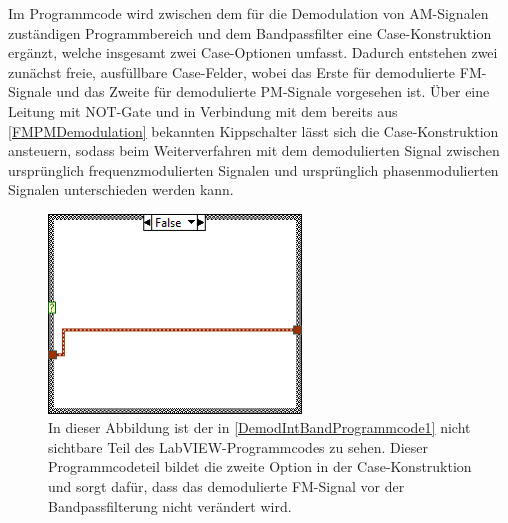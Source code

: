 \documentclass[
a4paper,
12pt,
pagesize,
ngerman
]{scrartcl}
\begin{document}
	
	Im Programmcode wird zwischen dem für die Demodulation von AM-Signalen zuständigen Programmbereich und dem Bandpassfilter eine Case-Konstruktion ergänzt, welche insgesamt zwei Case-Optionen umfasst.
	Dadurch entstehen zwei zunächst freie, ausfüllbare Case-Felder, wobei das Erste für demodulierte FM-Signale und das Zweite für demodulierte PM-Signale vorgesehen ist.
	Über eine Leitung mit NOT-Gate und in Verbindung mit dem bereits aus \cref{FMPMDemodulation} bekannten Kippschalter lässt sich die Case-Konstruktion ansteuern, sodass beim Weiterverfahren mit dem demodulierten Signal zwischen ursprünglich frequenzmodulierten Signalen und ursprünglich phasenmodulierten Signalen unterschieden werden kann.
	
	\begin{figure}[H]
		\centering
		\includegraphics[width=0.6\textwidth]{EIRE2018Dateien/Tag4/OsziFMPM-Demod/mitBandpassUndIntegrationBilder/OsziPlusFMPMd6}
		\caption{In dieser Abbildung ist der in \cref{DemodIntBandProgrammcode1} nicht sichtbare Teil des LabVIEW-Programmcodes zu sehen. Dieser Programmcodeteil bildet die zweite Option in der Case-Konstruktion und sorgt dafür, dass das demodulierte FM-Signal vor der Bandpassfilterung nicht verändert wird.}
		\label{DemodIntBandProgrammcode2}
	\end{figure}
	
\end{document}
